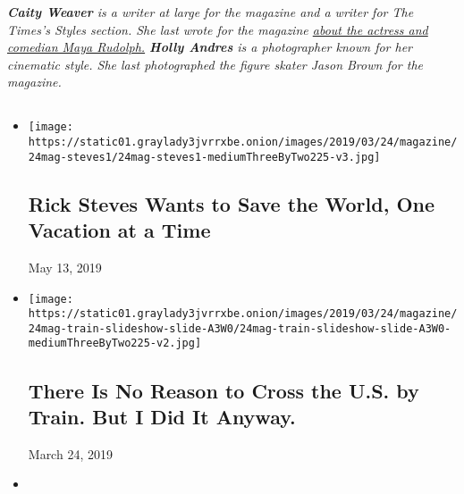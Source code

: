 \emph{\textbf{Caity Weaver} is a writer at large for the magazine and a
writer for The Times's Styles section. She last wrote for the magazine
\href{https://www.nytimes3xbfgragh.onion/2018/09/14/magazine/maya-rudolph-snl-amazon-forever.html}{about
the actress and comedian Maya Rudolph.} \textbf{Holly Andres} is a
photographer known for her cinematic style. She last photographed the
figure skater Jason Brown for the magazine.}

\hypertarget{-8}{%
\subsection{}\label{-8}}

\begin{itemize}
\item
  \href{https://www.nytimes3xbfgragh.onion/interactive/2019/03/20/magazine/rick-steves-travel-world.html}{}

  \texttt{[image: https://static01.graylady3jvrrxbe.onion/images/2019/03/24/magazine/24mag-steves1/24mag-steves1-mediumThreeByTwo225-v3.jpg]}

  \hypertarget{rick-steves-wants-to-save-the-world-one-vacation-at-a-time}{%
  \subsection{Rick Steves Wants to Save the World, One Vacation at a
  Time}\label{rick-steves-wants-to-save-the-world-one-vacation-at-a-time}}

  May 13, 2019
\item
  \href{https://www.nytimes3xbfgragh.onion/interactive/2019/03/20/magazine/train-across-america-amtrak.html}{}

  \texttt{[image: https://static01.graylady3jvrrxbe.onion/images/2019/03/24/magazine/24mag-train-slideshow-slide-A3W0/24mag-train-slideshow-slide-A3W0-mediumThreeByTwo225-v2.jpg]}

  \hypertarget{there-is-no-reason-to-cross-the-us-by-train-but-i-did-it-anyway}{%
  \subsection{There Is No Reason to Cross the U.S. by Train. But I Did
  It
  Anyway.}\label{there-is-no-reason-to-cross-the-us-by-train-but-i-did-it-anyway}}

  March 24, 2019
\item
  \href{https://www.nytimes3xbfgragh.onion/interactive/2019/03/21/magazine/mushrooms-sweden-island.html}{}


\end{itemize}
